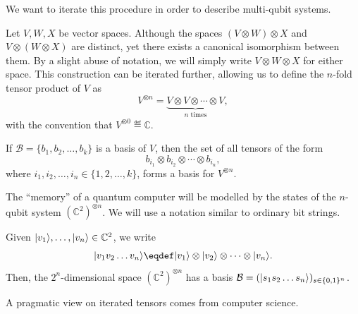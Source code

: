 \documentclass[a4paper, oneside, 12pt]{amsart}
\begin{document}
We want to iterate this procedure in order to describe multi-qubit systems.

\begin{remark}\label{rmk:iterated-tensor-products}
  Let \( V, W, X \) be vector spaces.
  Although the spaces \( (V \otimes W) \otimes X \) and \( V \otimes (W \otimes X) \) are distinct, yet there exists a canonical isomorphism between them.
  By a slight abuse of notation, we will simply write \( V \otimes W \otimes X \) for either space.
  This construction can be iterated further, allowing us to define the \( n \)-fold tensor product of \( V \) as
  \begin{equation}
    V^{\otimes n} = \underbrace{V \otimes V \otimes \cdots \otimes V}_{n \text{ times}},
  \end{equation}
  with the convention that \( V^{\otimes 0} \eqdef \mathbb{C} \).

  If \( \mathcal{B} = \{b_1, b_2, \ldots, b_k\} \) is a basis of \( V \), then the set of all tensors of the form
  \begin{equation*}
    b_{i_1} \otimes b_{i_2} \otimes \cdots \otimes b_{i_n},
  \end{equation*}
  where \( i_1, i_2, \ldots, i_n \in \{1, 2, \ldots, k\} \), forms a basis for \( V^{\otimes n} \).
\end{remark}


The ``memory'' of a quantum computer will be modelled by the states of the \( n \)-qubit system \(( \mathbb{C}^{2})^{\otimes n}\).
We will use a notation similar to ordinary bit strings.

\begin{example}\label{ex:n-qubits}
  Given \(\lvert v_{1}\rangle, \dots , \lvert v_{n}\rangle \in \mathbb{C}^{2} \), we write
  \begin{equation}
    \ket{v_{1} v_{2} \dots v_{n}} \eqdef \ket{v_{1}}\otimes \ket{v_{2}} \otimes \dots \otimes \ket{v_{n}}.
  \end{equation}
  Then, the \(2^{n}\)-dimensional space \( (\mathbb{C}^{2})^{\otimes n}\)  has a basis \(\mathcal{B}= (\lvert s_{1} s_{2} \dots s_{n}\rangle)_{s\in\{0,1\}^{n}}\).
\end{example}


A pragmatic view on iterated tensors comes from computer science.
\end{document}
